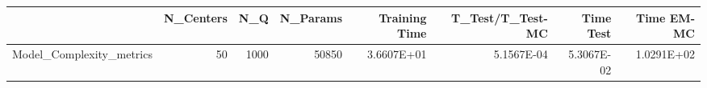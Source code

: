 \begin{tabular}{lrrrrrrr}
\toprule
{} &  N\_Centers &   N\_Q &  N\_Params &  Training Time &  T\_Test/T\_Test-MC &  Time Test &  Time EM-MC \\
\midrule
Model\_Complexity\_metrics &         50 &  1000 &     50850 &     3.6607E+01 &        5.1567E-04 & 5.3067E-02 &  1.0291E+02 \\
\bottomrule
\end{tabular}
